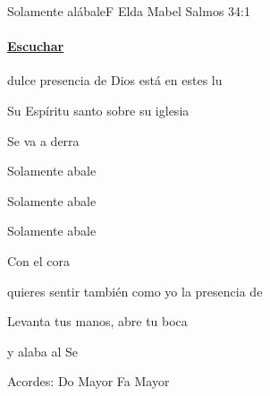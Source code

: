 \documentclass[12pt, spanish]{book}
\newcommand{\NotCCLIed}{\relax}
\begin{document}
    \begin{song}{Solamente alábale}{F}
        {} %
        {Elda Mabel}
        {Salmos 34:1} %
        {} %
        \ifChordBk
        \paragraph{\mbox{}\hfill\protect\href{https://open.spotify.com/intl-es/track/6PO134QzIhsedc84rJKYmk}{Escuchar}\mbox{}\hfill}
        \fi



        \begin{SBOpGroup}
             dulce presencia de Dios está en estes lu

            Su Espíritu santo sobre su iglesia

            Se va a derra
        \end{SBOpGroup}

        \begin{SBChorus}
            Solamente abale

            Solamente abale

            Solamente abale

            Con el cora
        \end{SBChorus}

        \begin{SBOpGroup}
             quieres sentir también como yo la presencia de 

            Levanta tus manos, abre tu boca

            y alaba al Se
        \end{SBOpGroup}

        \ifChordBk
        \begin{SBOpGroup}
            Acordes:
            \upchord{\C}\qquad Do Mayor \hfill
            \upchord{\F}\qquad Fa Mayor \hfill\null\break
        \end{SBOpGroup}
        \fi
    \end{song}
\end{document}
